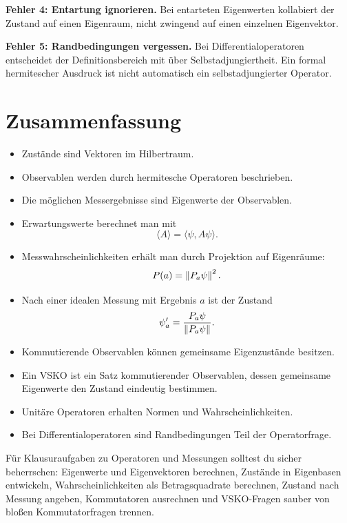 \begin{notebox}
\textbf{Fehler 4: Entartung ignorieren.}
Bei entarteten Eigenwerten kollabiert der Zustand auf einen Eigenraum, nicht zwingend auf einen einzelnen Eigenvektor.
\end{notebox}

\begin{notebox}
\textbf{Fehler 5: Randbedingungen vergessen.}
Bei Differentialoperatoren entscheidet der Definitionsbereich mit über Selbstadjungiertheit. Ein formal hermitescher Ausdruck ist nicht automatisch ein selbstadjungierter Operator.
\end{notebox}

\section{Zusammenfassung}

\begin{itemize}
    \item Zustände sind Vektoren im Hilbertraum.
    \item Observablen werden durch hermitesche Operatoren beschrieben.
    \item Die möglichen Messergebnisse sind Eigenwerte der Observablen.
    \item Erwartungswerte berechnet man mit
    \[
        \langle A\rangle=\langle\psi,A\psi\rangle.
    \]
    \item Messwahrscheinlichkeiten erhält man durch Projektion auf Eigenräume:
    \[
        P(a)=\left\lVert P_a\psi \right\rVert^2.
    \]
    \item Nach einer idealen Messung mit Ergebnis $a$ ist der Zustand
    \[
        \psi_a'=\frac{P_a\psi}{\left\lVert P_a\psi \right\rVert}.
    \]
    \item Kommutierende Observablen können gemeinsame Eigenzustände besitzen.
    \item Ein VSKO ist ein Satz kommutierender Observablen, dessen gemeinsame Eigenwerte den Zustand eindeutig bestimmen.
    \item Unitäre Operatoren erhalten Normen und Wahrscheinlichkeiten.
    \item Bei Differentialoperatoren sind Randbedingungen Teil der Operatorfrage.
\end{itemize}

\begin{examtipbox}
Für Klausuraufgaben zu Operatoren und Messungen solltest du sicher beherrschen: Eigenwerte und Eigenvektoren berechnen, Zustände in Eigenbasen entwickeln, Wahrscheinlichkeiten als Betragsquadrate berechnen, Zustand nach Messung angeben, Kommutatoren ausrechnen und VSKO-Fragen sauber von bloßen Kommutatorfragen trennen.
\end{examtipbox}
